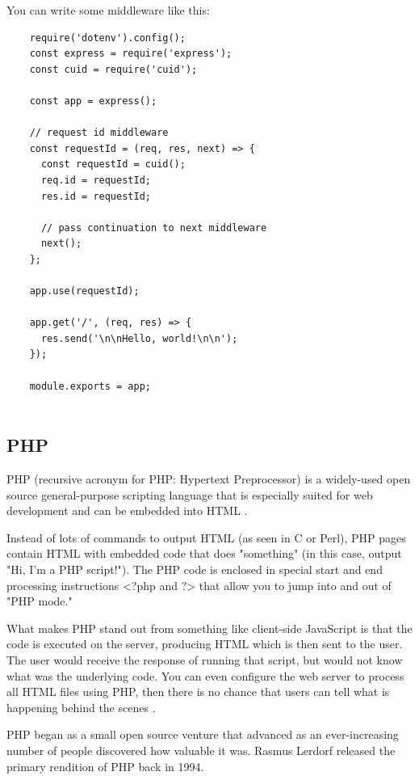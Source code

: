 \documentclass[../thesis.tex]{subfiles}
\begin{document}
You can write some middleware like this:
\begin{lstlisting}
    require('dotenv').config();
    const express = require('express');
    const cuid = require('cuid');
    
    const app = express();
    
    // request id middleware
    const requestId = (req, res, next) => {
      const requestId = cuid();
      req.id = requestId;
      res.id = requestId;
    
      // pass continuation to next middleware
      next();
    };
    
    app.use(requestId);
    
    app.get('/', (req, res) => {
      res.send('\n\nHello, world!\n\n');
    });
    
    module.exports = app;
    
\end{lstlisting}
\newpage

\subsection{PHP}
PHP (recursive acronym for PHP: Hypertext Preprocessor) is a widely-used open source general-purpose scripting language that is especially suited for web development and can be embedded into HTML \cite{php}.
\newline

Instead of lots of commands to output HTML (as seen in C or Perl), PHP pages contain HTML with embedded code that does "something" (in this case, output "Hi, I'm a PHP script!"). The PHP code is enclosed in special start and end processing instructions <?php and ?> that allow you to jump into and out of "PHP mode."
\newline
    
What makes PHP stand out from something like client-side JavaScript is that the code is executed on the server, producing HTML which is then sent to the user. The user would receive the response of running that script, but would not know what was the underlying code. You can even configure the web server to process all HTML files using PHP, then there is no chance that users can tell what is happening behind the scenes \cite{php}.
\newline

PHP began as a small open source venture that advanced as an ever-increasing number of people discovered how valuable it was. Rasmus Lerdorf released the primary rendition of PHP back in 1994.
\newline
    
\end{document}
